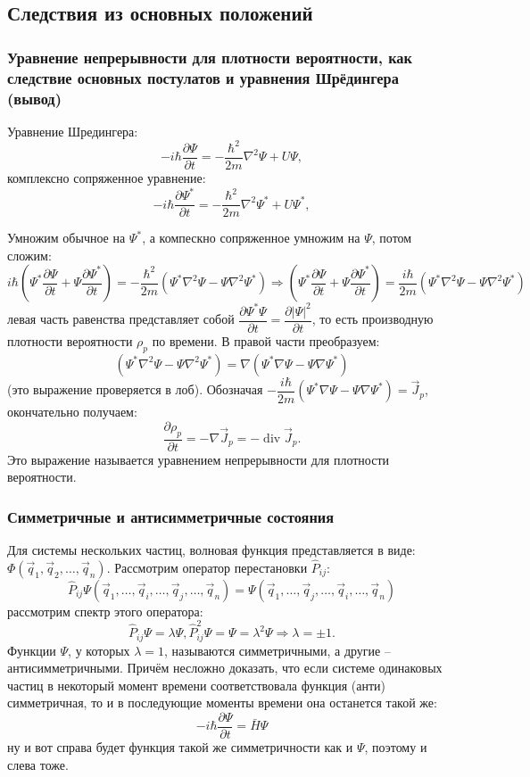 \subsection{Следствия из основных положений}

\subsubsection{Уравнение непрерывности для плотности вероятности, как следствие основных
постулатов и уравнения Шрёдингера (вывод)}

Уравнение Шредингера:
\[
  -i \hbar \dfrac{\partial \Psi}{\partial t} = - \dfrac{\hbar^2}{2m} \nabla^2 \Psi + U \Psi,
\]
комплексно сопряженное уравнение:
\[
  -i \hbar \dfrac{\partial \Psi^*}{\partial t} = - \dfrac{\hbar^2}{2m} \nabla^2 \Psi^* + U \Psi^*,
\]

Умножим обычное на $\Psi^*$, а компескно сопряженное умножим на $\Psi$, потом сложим:
\[
  i \hbar \left( \Psi^* \dfrac{\partial \Psi}{\partial t} + \Psi \dfrac{\partial \Psi^*}{\partial t} \right)
  = - \dfrac{\hbar^2}{2m} \left( \Psi^* \nabla^2 \Psi - \Psi \nabla^2 \Psi^* \right) 
  \Rightarrow
  \left( \Psi^* \dfrac{\partial \Psi}{\partial t} + \Psi \dfrac{\partial \Psi^*}{\partial t} \right)
  = \dfrac{i \hbar}{2m} \left( \Psi^* \nabla^2 \Psi - \Psi \nabla^2 \Psi^* \right) 
\]
левая часть равенства представляет собой $\dfrac{\partial \Psi^* \Psi}{\partial t} =
\dfrac{\partial |\Psi|^2}{\partial t}$, то есть производную плотности вероятности $\rho_p$
по времени. В правой части преобразуем:
\[
  \left( \Psi^* \nabla^2 \Psi - \Psi \nabla^2 \Psi^* \right)
  = \nabla \left( \Psi^* \nabla \Psi - \Psi \nabla \Psi^* \right)
\]
(это выражение проверяется в лоб). Обозначая $ - \dfrac{i \hbar}{2m} \left( \Psi^* \nabla \Psi - \Psi \nabla \Psi^* \right) = \vec{J}_p$, окончательно получаем:
\[
  \dfrac{\partial \rho_p}{\partial t} = - \nabla \vec{J}_p =  - \operatorname{div} \vec{J}_p.
\]
Это выражение называется уравнением непрерывности для плотности вероятности.

\subsubsection{Симметричные и антисимметричные состояния}

Для системы нескольких частиц, волновая функция представляется в виде: $\Phi( \vec{q}_1, \vec{q}_2, \dots, \vec{q}_n )$. Рассмотрим оператор перестановки $\hat{P}_{ij}$:
\[
  \hat{P}_{ij} \Psi(\vec{q}_1, \dots, \vec{q}_i, \dots, \vec{q}_j, \dots, \vec{q}_n)
  = \Psi(\vec{q}_1, \dots, \vec{q}_j, \dots, \vec{q}_i, \dots, \vec{q}_n)
\]
рассмотрим спектр этого оператора:
\[
  \hat{P}_{ij} \Psi = \lambda \Psi, \hat{P}^2_{ij} \Psi = \Psi = \lambda^2 \Psi 
  \Rightarrow
  \lambda = \pm 1.
\]
Функции $\Psi$, у которых $\lambda = 1$, называются симметричными, а другие -- антисимметричными. Причём несложно доказать, что если системе одинаковых частиц в некоторый момент времени соответствовала функция (анти) симметричная, то и в последующие моменты времени она останется такой же:
\[
  - i \hbar \dfrac{\partial \Psi}{\partial t} = \bar{H} \Psi
\]
ну и вот справа будет функция такой же симметричности как и $\Psi$, поэтому и слева тоже.

